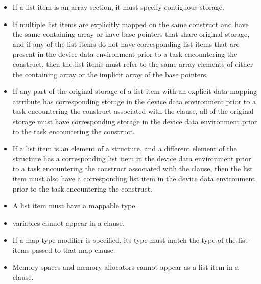 \begin{itemize}
\item If a list item is an array section, it must specify contiguous storage.
\item If multiple list items are explicitly mapped on the same construct and 
      have the same containing array or have base pointers that share original 
      storage, and if any of the list items do not have corresponding list
      items that are present in the device data environment prior to a task
      encountering the construct, then the list items must refer to the same 
      array elements of either the containing array or the implicit array of 
      the base pointers.
\item If any part of the original storage of a list item with an explicit 
      data-mapping attribute has corresponding storage in the device data
      environment prior to a task encountering the construct associated with the
       clause, all of the original storage must have corresponding storage
      in the device data environment prior to the task encountering the construct.
\item If a list item is an element of a structure, and a different element
      of the structure has a corresponding list item in the device data 
      environment prior to a task encountering the construct associated 
      with the  clause, then the list item must also have a 
      corresponding list item in the device data environment prior to 
      the task encountering the construct.
\item A list item must have a mappable type.
\item {} variables cannot appear in a  clause.
\item If a  map-type-modifier is specified, its type must match 
      the type of the list-items passed to that map clause.
\item Memory spaces and memory allocators cannot appear as a list item in 
      a  clause.



\end{itemize}

